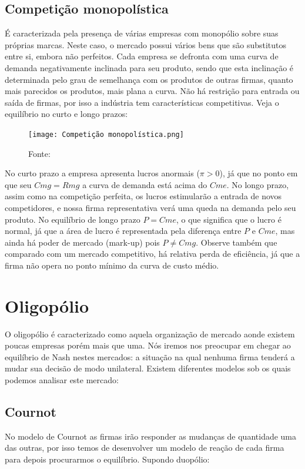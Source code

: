 \documentclass[12pt,a4paper,oneside,brazil]{abntex2}
\begin{document}
\section{Competição monopolística}
É caracterizada pela presença de várias empresas com monopólio sobre suas próprias marcas. Neste caso, o mercado possui vários bens que são substitutos entre si, embora não perfeitos. Cada empresa se defronta com uma curva de demanda negativamente inclinada para seu produto, sendo que esta inclinação é determinada pelo grau de semelhança com os produtos de outras firmas, quanto mais parecidos os produtos, mais plana a curva. Não há restrição para entrada ou saída de firmas, por isso a indústria tem características competitivas. Veja o equilíbrio no curto e longo prazos:

\begin{figure}[h]
	\texttt{[image: Competição monopolística.png]}
	\centering
	\caption{Fonte: \cite[p. 450]{pindyck}}
\end{figure}

No curto prazo a empresa apresenta lucros anormais ($\pi > 0$), já que no ponto em que seu $Cmg = Rmg$  a curva de demanda está acima do $Cme$. No longo prazo, assim como na competição perfeita, os lucros estimularão a entrada de novos competidores, e nossa firma representativa verá uma queda na demanda pelo seu produto. No equilíbrio de longo prazo $P = Cme$, o que significa que o lucro é normal, já que a área de lucro é representada pela diferença entre $P$ e $Cme$, mas ainda há poder de mercado (mark-up) pois $ P \neq Cmg$. Observe também que comparado com um mercado competitivo, há relativa perda de eficiência, já que a firma não opera no ponto mínimo da curva de custo médio.

\chapter{Oligopólio}
O oligopólio é caracterizado como aquela organização de mercado aonde existem poucas empresas porém mais que uma. Nós iremos nos preocupar em chegar ao equilíbrio de Nash nestes mercados: a situação na qual nenhuma firma tenderá a mudar sua decisão de modo unilateral. Existem diferentes modelos sob os quais podemos analisar este mercado:

\section{Cournot}
No modelo de Cournot as firmas irão responder as mudanças de quantidade uma das outras, por isso temos de desenvolver um modelo de reação de cada firma para depois procurarmos o equilíbrio. Supondo duopólio:
\end{document}
